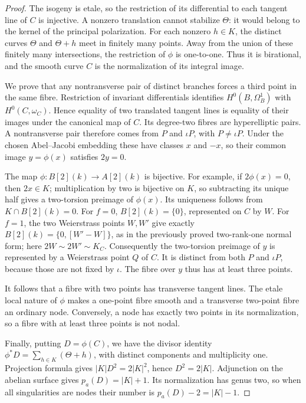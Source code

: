 \begin{proof}
The isogeny is etale, so the restriction of its differential to
each tangent line of $C$ is injective. A nonzero translation cannot
stabilize $\Theta$: it would belong to the kernel of the principal
polarization. For each nonzero $h\in K$, the distinct curves
$\Theta$ and $\Theta+h$ meet in finitely many points. Away from
the union of these finitely many intersections, the restriction
of $\phi$ is one-to-one. Thus it is birational, and the smooth
curve $C$ is the normalization of its integral image.

We prove that any nontransverse pair of distinct branches forces
a third point in the same fibre. Restriction of invariant
differentials identifies
$H^0(B,\Omega_B^1)$ with $H^0(C,\omega_C)$. Hence equality of
two translated tangent lines is equality of their images under
the canonical map of $C$. Its degree-two fibres are hyperelliptic
pairs. A nontransverse pair therefore comes from $P$ and
$\iota P$, with $P\ne\iota P$.
Under the chosen Abel--Jacobi embedding these have classes $x$
and $-x$, so their common image $y=\phi(x)$ satisfies $2y=0$.

The map $\phi:B[2](k)\to A[2](k)$ is bijective. For example,
if $2\phi(x)=0$, then $2x\in K$; multiplication by two is
bijective on $K$, so subtracting its unique half gives a
two-torsion preimage of $\phi(x)$. Its uniqueness follows from
$K\cap B[2](k)=0$.
For $f=0$, $B[2](k)=\{0\}$, represented on $C$ by $W$.
For $f=1$, the two Weierstrass points $W,W'$ give exactly
$B[2](k)=\{0,[W'-W]\}$, as in the previously proved
two-rank-one normal form; here $2W\sim2W'\sim K_C$.
Consequently the two-torsion preimage of $y$ is represented
by a Weierstrass point $Q$ of $C$. It is distinct from both
$P$ and $\iota P$, because those are not fixed by $\iota$.
The fibre over $y$ thus has at least three points.

It follows that a fibre with two points has transverse tangent
lines. The etale local nature of $\phi$ makes a one-point fibre
smooth and a transverse two-point fibre an ordinary node.
Conversely, a node has exactly two points in its normalization,
so a fibre with at least three points is not nodal.

Finally, putting $D=\phi(C)$, we have the divisor identity
$\phi^*D=\sum_{h\in K}(\Theta+h)$, with distinct components
and multiplicity one. Projection formula gives
$|K|D^2=2|K|^2$, hence $D^2=2|K|$.
Adjunction on the abelian surface gives $p_a(D)=|K|+1$.
Its normalization has genus two, so when all singularities
are nodes their number is $p_a(D)-2=|K|-1$.
\end{proof}

